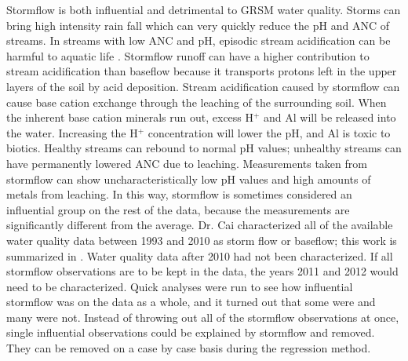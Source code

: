 Stormflow is both influential and detrimental  to GRSM water quality. 
Storms can bring high intensity rain fall which can very quickly reduce the pH and ANC of streams. 
In streams with low ANC and pH, episodic stream acidification can be harmful to aquatic life \citep{neff2009physiological}.  
Stormflow runoff can have a higher contribution to stream acidification than baseflow because it transports protons left in the upper layers of the soil by acid deposition. 
Stream acidification caused by stormflow can cause base cation exchange through the leaching of the surrounding soil. 
When the inherent base cation minerals run out, excess H$^+$ and Al will be released into the water. 
Increasing the H$^+$ concentration will lower the pH, and Al is toxic to biotics. 
Healthy streams can rebound to normal pH values; unhealthy streams can have permanently lowered ANC due to leaching.  
Measurements taken from stormflow can show uncharacteristically low pH values and high amounts of metals from leaching. 
In this way, stormflow is sometimes considered an influential group on the rest of the data, because the measurements are significantly different from the average. 
Dr. Cai characterized all of the available water quality data between 1993 and 2010 as storm flow or baseflow; this work is summarized in \citet{cai2013}. 
Water quality data after 2010 had not been characterized. 
If all stormflow observations are to be kept in the data, the years 2011 and 2012 would need to be characterized. 
Quick analyses were run to see how influential stormflow was on the data as a whole, and it turned out that some were and many were not. 
Instead of throwing out all of the stormflow observations at once, single influential observations could be explained by stormflow and removed. 
They can be removed on a case by case basis during the regression method.

